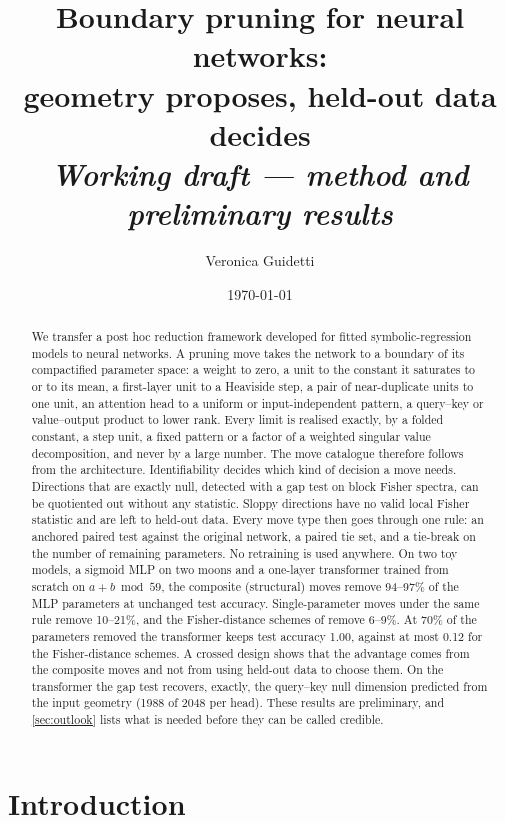 \documentclass[11pt,a4paper]{article}
\title{Boundary pruning for neural networks:\\[2pt]
\large geometry proposes, held-out data decides\\[2pt]
\normalsize\textit{Working draft --- method and preliminary results}}
\author{Veronica Guidetti}
\date{\today}
\theoremstyle{definition}
\begin{document}
\maketitle

\begin{abstract}
We transfer a post hoc reduction framework developed for fitted symbolic-regression
models to neural networks. A pruning move takes the network to a boundary of its
compactified parameter space: a weight to zero, a unit to the constant it saturates
to or to its mean, a first-layer unit to a Heaviside step, a pair of near-duplicate
units to one unit, an attention head to a uniform or input-independent pattern, a
query--key or value--output product to lower rank. Every limit is realised exactly,
by a folded constant, a step unit, a fixed pattern or a factor of a weighted singular
value decomposition, and never by a large number. The move catalogue therefore follows
from the architecture. Identifiability decides which kind of decision a move needs.
Directions that are exactly null, detected with a gap test on block Fisher spectra,
can be quotiented out without any statistic. Sloppy directions have no valid local
Fisher statistic and are left to held-out data. Every move type then goes through one
rule: an anchored paired test against the original network, a paired tie set, and
a tie-break on the number of remaining parameters. No retraining is used anywhere.
On two toy models, a sigmoid MLP on two moons and a one-layer transformer trained
from scratch on $a+b \bmod 59$, the composite (structural) moves remove 94--97\% of
the MLP parameters at unchanged test accuracy. Single-parameter moves under the same rule
remove 10--21\%, and the Fisher-distance schemes of \citet{berman2026fdist} remove
6--9\%. At 70\% of the parameters removed the transformer keeps test accuracy 1.00,
against at most 0.12 for the Fisher-distance schemes. A crossed design
shows that the advantage comes from the composite moves and not from using held-out
data to choose them. On the transformer the gap test recovers, exactly, the
query--key null dimension predicted from the input geometry (1988 of 2048 per head).
These results are preliminary, and \cref{sec:outlook} lists what is needed before
they can be called credible.
\end{abstract}

\tableofcontents

\section{Introduction}
\label{sec:intro}
\end{document}
